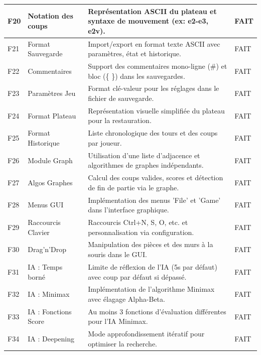 \documentclass[a4paper]{article}
\begin{document}
\begin{table}[H]
    \centering
    \begin{tabular}{|p{1.5cm}|p{3cm}|p{8.5cm}|p{2cm}|}
        \hline
        F20 & Notation des coups & Représentation ASCII du plateau et syntaxe de mouvement (ex: e2-e3, e2v). & FAIT \\
        \hline
        F21 & Format Sauvegarde & Import/export en format texte ASCII avec paramètres, état et historique. & FAIT \\
        \hline
        F22 & Commentaires & Support des commentaires mono-ligne (\#) et bloc (\{ \}) dans les sauvegardes. & FAIT \\
        \hline
        F23 & Paramètres Jeu & Format clé-valeur pour les réglages dans le fichier de sauvegarde. & FAIT \\
        \hline
        F24 & Format Plateau & Représentation visuelle simplifiée du plateau pour la restauration. & FAIT \\
        \hline
        F25 & Format Historique & Liste chronologique des tours et des coups par joueur. & FAIT \\
        \hline
        F26 & Module Graph & Utilisation d'une liste d'adjacence et algorithmes de graphes indépendants. & FAIT \\
        \hline
        F27 & Algos Graphes & Calcul des coups valides, scores et détection de fin de partie via le graphe. & FAIT \\
        \hline
        F28 & Menus GUI & Implémentation des menus 'File' et 'Game' dans l'interface graphique. & FAIT \\
        \hline
        F29 & Raccourcis Clavier & Raccourcis Ctrl+N, S, O, etc. et personnalisation via configuration. & FAIT \\
        \hline
        F30 & Drag'n'Drop & Manipulation des pièces et des murs à la souris dans le GUI. & FAIT \\
        \hline
        F31 & IA : Temps borné & Limite de réflexion de l'IA (5s par défaut) avec coup par défaut si dépassé. & FAIT \\
        \hline
        F32 & IA : Minimax & Implémentation de l'algorithme Minimax avec élagage Alpha-Beta. & FAIT \\
        \hline
        F33 & IA : Fonctions Score & Au moins 3 fonctions d'évaluation différentes pour l'IA Minimax. & FAIT \\
        \hline
        F34 & IA : Deepening & Mode approfondissement itératif pour optimiser la recherche. & FAIT \\

\end{tabular}
\end{table}
\end{document}
